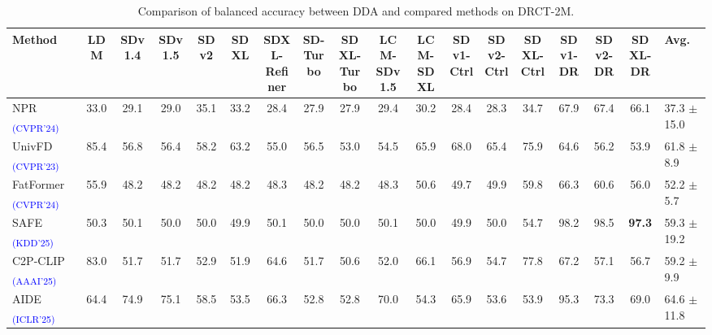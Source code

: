 \documentclass{article}
\begin{document}
\begin{table}[tb!]
  \centering
  \caption{Comparison of balanced accuracy between DDA and compared methods on DRCT-2M.}
  \label{tab:compare-drct}
  \begin{adjustbox}{width=1.0\linewidth}
  \begin{tabular}{lccccccccccccccccl}
  \toprule
  Method & LDM & SDv1.4 & SDv1.5 & SDv2 & SDXL & \makecell{SDXL-\\Refiner} & \makecell{SD-\\Turbo} & \makecell{SDXL-\\Turbo} & \makecell{LCM-\\SDv1.5} & \makecell{LCM-\\SDXL} & \makecell{SDv1-\\Ctrl} & \makecell{SDv2-\\Ctrl} & \makecell{SDXL-\\Ctrl} & \makecell{SDv1-\\DR} & \makecell{SDv2-\\DR} & \makecell{SDXL-\\DR} & Avg. \\
  \midrule
NPR \textsubscript{\textcolor{blue}{(CVPR'24)}} \cite{cozzolino2024zero} & 33.0 & 29.1 & 29.0 & 35.1 & 33.2 & 28.4 & 27.9 & 27.9 & 29.4 & 30.2 & 28.4 & 28.3 & 34.7 & 67.9 & 67.4 & 66.1 & 37.3 $\pm$ 15.0 \\
UnivFD \textsubscript{\textcolor{blue}{(CVPR'23)}} \cite{ojha2023towards} & 85.4 & 56.8 & 56.4 & 58.2 & 63.2 & 55.0 & 56.5 & 53.0 & 54.5 & 65.9 & 68.0 & 65.4 & 75.9 & 64.6 & 56.2 & 53.9 & 61.8 $\pm$ 8.9 \\
FatFormer \textsubscript{\textcolor{blue}{(CVPR'24)}} \cite{liu2024forgery} & 55.9 & 48.2 & 48.2 & 48.2 & 48.2 & 48.3 & 48.2 & 48.2 & 48.3 & 50.6 & 49.7 & 49.9 & 59.8 & 66.3 & 60.6 & 56.0 & 52.2 $\pm$ 5.7 \\
SAFE \textsubscript{\textcolor{blue}{(KDD'25)}} \cite{li2024improving} & 50.3 & 50.1 & 50.0 & 50.0 & 49.9 & 50.1 & 50.0 & 50.0 & 50.1 & 50.0 & 49.9 & 50.0 & 54.7 & 98.2 & 98.5 & \textbf{97.3} & 59.3 $\pm$ 19.2 \\
C2P-CLIP \textsubscript{\textcolor{blue}{(AAAI'25)}} \cite{tan2024c2p} & 83.0 & 51.7 & 51.7 & 52.9 & 51.9 & 64.6 & 51.7 & 50.6 & 52.0 & 66.1 & 56.9 & 54.7 & 77.8 & 67.2 & 57.1 & 56.7 & 59.2 $\pm$ 9.9 \\
AIDE \textsubscript{\textcolor{blue}{(ICLR'25)}} \cite{yan2024sanity} & 64.4 & 74.9 & 75.1 & 58.5 & 53.5 & 66.3 & 52.8 & 52.8 & 70.0 & 54.3 & 65.9 & 53.6 & 53.9 & 95.3 & 73.3 & 69.0 & 64.6 $\pm$ 11.8 \\

\end{tabular}
\end{adjustbox}
\end{table}
\end{document}

